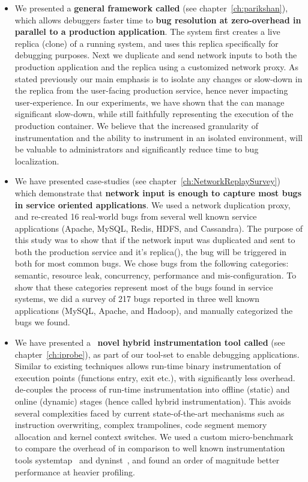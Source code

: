 \begin{itemize}
	\item We presented a \textbf{general framework called  \parikshan} (see chapter~\ref{ch:parikshan}), which allows debuggers faster time to \textbf{bug resolution at zero-overhead in parallel to a production application}. 
	The system first creates a live replica (clone) of a running system, and uses this replica specifically for debugging purposes.
	Next we duplicate and send network inputs to both the production application and the replica using a customized network proxy.
	As stated previously our main emphasis is to isolate any changes or slow-down in the replica from the user-facing production service, hence never impacting user-experience.
	In our experiments, we have shown that the \debugcontainer can manage significant slow-down, while still faithfully representing the execution of the production container.
	We believe that the increased granularity of instrumentation and the ability to instrument in an isolated environment, will be valuable to administrators and significantly reduce time to bug localization.
	
	\item We have presented case-studies (see chapter~\ref{ch:NetworkReplaySurvey}) which demonstrate that \textbf{network input is enough to capture most bugs in service oriented applications}. We used a network duplication proxy, and re-created 16 real-world bugs from several well known service applications (Apache, MySQL, Redis, HDFS, and Cassandra). The purpose of this study was to show that if the network input was duplicated and sent to both the production service and it's replica(\debugcontainer), the bug will be triggered in both for most common bugs.
	We chose bugs from the following categories: semantic, resource leak, concurrency, performance and mis-configuration. 
	To show that these categories represent most of the bugs found in service systems, we did a survey of 217 bugs reported in three well known applications (MySQL, Apache, and Hadoop), and manually categorized the bugs we found. 
	
	\item We have presented a ~\textbf{novel hybrid instrumentation tool called \iprobe} (see chapter~\ref{ch:iprobe}), as part of our tool-set to enable debugging applications. 
	Similar to existing techniques \iprobe allows run-time binary instrumentation of execution points (functions entry, exit etc.), with significantly less overhead.
	\iprobe de-couples the process of run-time instrumentation into offline (static) and online (dynamic) stages (hence called hybrid instrumentation). 
	This avoids several complexities faced by current state-of-the-art mechanisms such as instruction overwriting, complex trampolines, code segment memory allocation and kernel context switches.
	We used a custom micro-benchmark to compare the overhead of \iprobe in comparison to well known instrumentation tools systemtap~\cite{systemtap} and dyninst~\cite{dyninst}, and found an order of magnitude better performance at heavier profiling.
	

\end{itemize}
